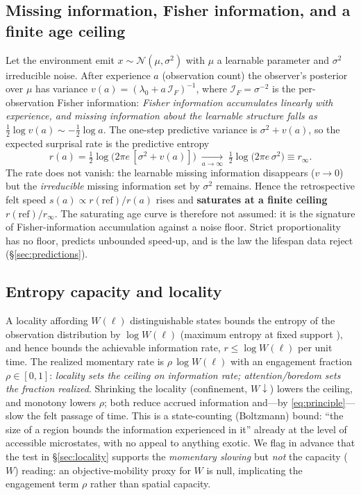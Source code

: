 \documentclass[11pt]{article}
\begin{document}
\subsection{Missing information, Fisher information, and a finite age ceiling}
\label{sec:fisher}
Let the environment emit $x\sim\mathcal{N}(\mu,\sigma^2)$ with $\mu$ a learnable parameter
and $\sigma^2$ irreducible noise. After experience $a$ (observation count) the observer's
posterior over $\mu$ has variance $v(a)=(\lambda_0+a\,\mathcal{I}_F)^{-1}$, where
$\mathcal{I}_F=\sigma^{-2}$ is the per-observation Fisher information: \emph{Fisher
information accumulates linearly with experience, and missing information about the
learnable structure falls as $\tfrac12\log v(a)\sim-\tfrac12\log a$}. The one-step
predictive variance is $\sigma^2+v(a)$, so the expected surprisal rate is the predictive
entropy
\begin{equation}
r(a)=\tfrac12\log\!\big(2\pi e\,[\sigma^2+v(a)]\big)
\;\xrightarrow[a\to\infty]{}\;\tfrac12\log\!\big(2\pi e\,\sigma^2\big)\equiv r_\infty .
\end{equation}
The rate does not vanish: the learnable missing information disappears ($v\to0$) but the
\emph{irreducible} missing information set by $\sigma^2$ remains. Hence the retrospective
felt speed $s(a)\propto r(\text{ref})/r(a)$ rises and \textbf{saturates at a finite ceiling}
$r(\text{ref})/r_\infty$. The saturating age curve is therefore not assumed: it is the
signature of Fisher-information accumulation against a noise floor. Strict proportionality
has no floor, predicts unbounded speed-up, and is the law the lifespan data reject
(\S\ref{sec:predictions}).

\subsection{Entropy capacity and locality}
\label{sec:capacity}
A locality affording $W(\ell)$ distinguishable states bounds the entropy of the observation
distribution by $\log W(\ell)$ (maximum entropy at fixed support \citep{jaynes1957information}), and hence bounds the
achievable information rate, $r \le \log W(\ell)$ per unit time. The realized momentary rate
is $\rho\,\log W(\ell)$ with an engagement fraction $\rho\in[0,1]$: \emph{locality sets the
ceiling on information rate; attention/boredom sets the fraction realized}. Shrinking the
locality (confinement, $W\!\downarrow$) lowers the ceiling, and monotony lowers $\rho$; both
reduce accrued information and---by \eqref{eq:principle}---slow the felt passage of time.
This is a state-counting (Boltzmann) bound: ``the size of a region bounds the information
experienced in it'' already at the level of accessible microstates, with no appeal to
anything exotic. We flag in advance that the test in \S\ref{sec:locality} supports the
\emph{momentary slowing} but \emph{not} the capacity ($W$) reading: an objective-mobility
proxy for $W$ is null, implicating the engagement term $\rho$ rather than spatial capacity.
\end{document}
